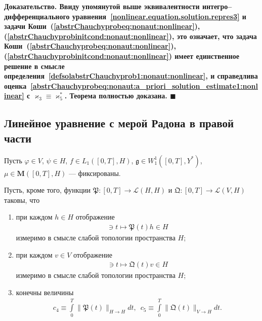 \documentclass{report}
\newenvironment{Proof}{\par\noindent\bf Доказательство.\rm}{ $\blacksquare$\par}
\begin{document}
\begin{Proof}
Ввиду упомянутой выше эквивалентности интегро--дифференциального уравнения~\ref{nonlinear.equation.solution.repres3} и задачи Коши~(\ref{abstrChauchyprobeq:nonaut:nonlinear}), (\ref{abstrChauchyprobinitcond:nonaut:nonlinear}), это означает, что задача Коши~(\ref{abstrChauchyprobeq:nonaut:nonlinear}), (\ref{abstrChauchyprobinitcond:nonaut:nonlinear}) имеет единственное решение в смысле определения~\ref{defsolabstrChauchyprob1:nonaut:nonlinear}, и справедлива оценка~\eqref{abstrChauchyprobeq:nonaut:a_priori_solution_estimate1:nonlinear} с $\varkappa_3\equiv\varkappa_5^*$. Теорема полностью доказана.
\end{Proof}

	    \subsection{Линейное уравнение с мерой Радона в правой части}
Пусть $\varphi\in V$, $\psi\in H$, $f\in L_1([0,T],H)$, $\mathfrak{g}\in W^1_1([0,T], Y^*)$, $\mu\in\mathbf{M}([0,T],H)$ --- фиксированы.

Пусть, кроме того, функции $\mathfrak{P}:[0,T]\to\mathcal{L}(H,H)$ и $\mathfrak{Q}:[0,T]\to\mathcal{L}(V,H)$ таковы, что
\begin{enumerate}
\item при каждом $h\in H$ отображение 
\begin{gather*}
[0,T]\ni t\mapsto\mathfrak{P}(t)h\in H
\end{gather*}
измеримо в смысле слабой топологии пространства $H$;

\item при каждом $v\in V$ отображение 
\begin{gather*}
[0,T]\ni t\mapsto\mathfrak{Q}(t)v\in H
\end{gather*}
измеримо в смысле слабой топологии пространства $H$;

\item конечны величины
\begin{gather*}
c_4\equiv\int\limits_0^T\|\mathfrak{P}(t)\|_{H\to H}dt,\,\,\,c_5\equiv\int\limits_0^T\|\mathfrak{Q}(t)\|_{V\to H}dt.
\end{gather*}
\end{enumerate}
\end{document}
